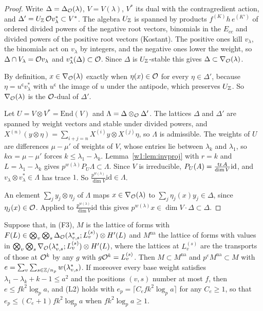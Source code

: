 \begin{proof}
Write $\Delta=\Delta_\mathcal O(\lambda)$, $V=V(\lambda)$, $V^*$ its dual with the contragredient action, and $\Delta'=U_\mathbb Z\,\mathcal O v_\lambda^*\subset V^*$. The algebra $U_\mathbb Z$ is spanned by products $f^{(K)}h\,e^{(K')}$ of ordered divided powers of the negative root vectors, binomials in the $E_{cc}$ and divided powers of the positive root vectors (Kostant). The positive ones kill $v_\lambda$, the binomials act on $v_\lambda$ by integers, and the negative ones lower the weight, so $\Delta\cap V_\lambda=\mathcal O v_\lambda$ and $v_\lambda^*(\Delta)\subset\mathcal O$. Since $\Delta$ is $U_\mathbb Z$-stable this gives $\Delta\subset\nabla_\mathcal O(\lambda)$.

By definition, $x\in\nabla_\mathcal O(\lambda)$ exactly when $\eta(x)\in\mathcal O$ for every $\eta\in\Delta'$, because $\eta=u^{\mathsf c}v_\lambda^*$ with $u^{\mathsf c}$ the image of $u$ under the antipode, which preserves $U_\mathbb Z$. So $\nabla_\mathcal O(\lambda)$ is the $\mathcal O$-dual of $\Delta'$.

Let $U=V\otimes V^*=\mathrm{End}(V)$ and $\Lambda=\Delta\otimes_\mathcal O\Delta'$. The lattices $\Delta$ and $\Delta'$ are spanned by weight vectors and stable under divided powers, and $X^{(n)}(y\otimes\eta)=\sum_{i+j=n}X^{(i)}y\otimes X^{(j)}\eta$, so $\Lambda$ is admissible. The weights of $U$ are differences $\mu-\mu'$ of weights of $V$, whose entries lie between $\lambda_k$ and $\lambda_1$, so $k\alpha=\mu-\mu'$ forces $k\le\lambda_1-\lambda_k$. Lemma~\ref{w1:lem:invproj} with $r=k$ and $L=\lambda_1-\lambda_k$ gives $p^{w(\lambda)}P_U\Lambda\subset\Lambda$. Since $V$ is irreducible, $P_U(A)=\frac{\operatorname{tr} A}{\dim V}\mathrm{id}$, and $v_\lambda\otimes v_\lambda^*\in\Lambda$ has trace $1$. So $\frac{p^{w(\lambda)}}{\dim V}\mathrm{id}\in\Lambda$.

An element $\sum_jy_j\otimes\eta_j$ of $\Lambda$ maps $x\in\nabla_\mathcal O(\lambda)$ to $\sum_j\eta_j(x)y_j\in\Delta$, since $\eta_j(x)\in\mathcal O$. Applied to $\frac{p^{w(\lambda)}}{\dim V}\mathrm{id}$ this gives $p^{w(\lambda)}x\in\dim V\cdot\Delta\subset\Delta$.
\end{proof}

\begin{corollary}[input (L2)]\label{r2:cor:L2}
Suppose that, in (F3), $M$ is the lattice of forms with $F(L)\in\bigotimes_v\bigotimes_s\Delta_\mathcal O(\lambda^*_{v,s};L_v^{(s)})\otimes H'(L)$ and $M^{\mathrm{na}}$ the lattice of forms with values in $\bigotimes_v\bigotimes_s\nabla_\mathcal O(\lambda^*_{v,s};L_v^{(s)})\otimes H'(L)$, where the lattices at $L_v^{(s)}$ are the transports of those at $\mathcal O^k$ by any $g$ with $g\mathcal O^k=L_v^{(s)}$. Then $M\subset M^{\mathrm{na}}$ and $p^{e}M^{\mathrm{na}}\subset M$ with $e=\sum_v\sum_{s\in\mathbb Z/n_p}w(\lambda^*_{v,s})$. If moreover every base weight satisfies $\lambda_1-\lambda_k+k-1\le a^2$ and the positions $(v,s)$ number at most $f$, then $e\le fk^2\log_pa$, and (L2) holds with $e_p=\lceil C_efk^2\log_pa\rceil$ for any $C_e\ge1$, so that $e_p\le(C_e+1)fk^2\log_pa$ when $fk^2\log_pa\ge1$.
\end{corollary}

